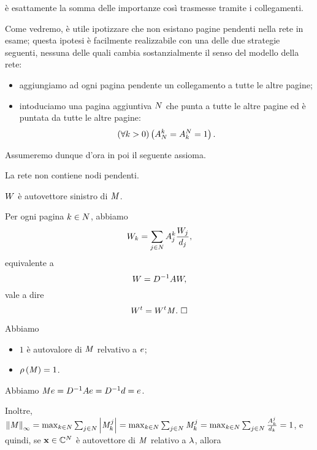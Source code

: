 \`e esattamente la somma delle importanze cos\`i trasmesse tramite i
collegamenti.
\par Come vedremo, \`e utile ipotizzare che non esistano pagine pendenti
nella rete in esame; questa ipotesi \`e facilmente realizzabile con una delle due strategie seguenti, nessuna delle quali cambia sostanzialmente
il senso del modello della rete:
\begin{itemize}
  \item aggiungiamo ad ogni pagina pendente un collegamento a tutte
    le altre pagine;
  \item intoduciamo una pagina aggiuntiva $N$ che punta a tutte 
  le altre pagine ed \`e puntata da tutte le altre pagine:
  \[
    \left ( \forall k > 0 \right ) \left ( A_N^k
    = A_k^N = 1 \right ).
  \]
\end{itemize}
\par Assumeremo dunque d'ora in poi il seguente assioma.
\begin{Axiom}
  La rete non contiene nodi pendenti.
\end{Axiom}
\begin{Theorem}
  $W$ \`e autovettore sinistro di $\mathit{M}$.
\end{Theorem}
\Proof Per ogni pagina $k \in N$, abbiamo
\[
  W_k = \sum_{j \in N} A_j^k \frac{W_j}{d_j},
\]
equivalente a
\[
  W = D^{-1}AW,
\]
vale a dire
\[
  {W}^t = {W}^t\mathit{M}.\text{ $\square$}
\]
\begin{Theorem}
  Abbiamo
  \begin{itemize}
    \item $1$ \`e autovalore di $\mathit{M}$ relvativo a $e$;
    \item $\rho \left ( \mathit{M} \right ) = 1$.
  \end{itemize}
\end{Theorem}
\Proof Abbiamo
$\mathit{M}e
= D^{-1}Ae
= D^{-1}d
= e$.
\par Inoltre,
$\Norm{\Matrix}[\infty]
= \max_{k \in \PagesNumber} \sum_{j \in \PagesNumber}
  \AbsoluteValue{\Matrix_k^j}
= \max_{k \in \PagesNumber} \sum_{j \in \PagesNumber}
  \Matrix_k^j
= \max_{k \in \PagesNumber} \sum_{j \in \PagesNumber}
  \frac{\AdjacencyMatrix_k^j}{\PageDegree_k}
= 1$,
e quindi, se $\Eigenvector \in \mathbb{C}^\PagesNumber$ \`e autovettore
di $\mathit{M}$ relativo a $\lambda$, allora
